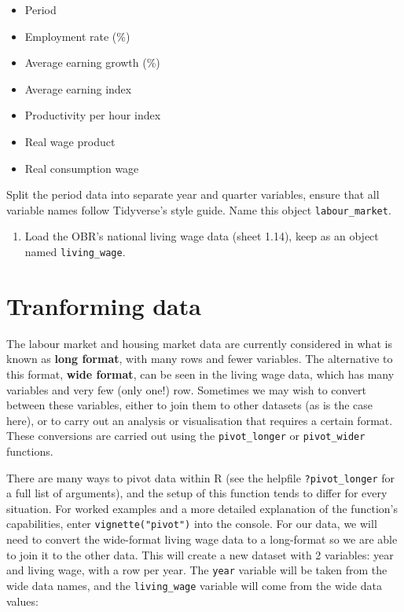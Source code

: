 \documentclass[
  letterpaper,
  DIV=11,
  numbers=noendperiod]{scrreprt}
\providecommand{\tightlist}{%
  \setlength{\itemsep}{0pt}\setlength{\parskip}{0pt}}\usepackage{longtable,booktabs,array}
\begin{document}
\begin{itemize}
\tightlist
\item
  Period
\item
  Employment rate (\%)
\item
  Average earning growth (\%)
\item
  Average earning index
\item
  Productivity per hour index
\item
  Real wage product
\item
  Real consumption wage
\end{itemize}

Split the period data into separate year and quarter variables, ensure
that all variable names follow Tidyverse's style guide. Name this object
\texttt{labour\_market}.

\begin{enumerate}
\def\labelenumi{\arabic{enumi}.}
\setcounter{enumi}{1}
\tightlist
\item
  Load the OBR's national living wage data (sheet 1.14), keep as an
  object named \texttt{living\_wage}.
\end{enumerate}

\section{Tranforming data}\label{tranforming-data}

The labour market and housing market data are currently considered in
what is known as \textbf{long format}, with many rows and fewer
variables. The alternative to this format, \textbf{wide format}, can be
seen in the living wage data, which has many variables and very few
(only one!) row. Sometimes we may wish to convert between these
variables, either to join them to other datasets (as is the case here),
or to carry out an analysis or visualisation that requires a certain
format. These conversions are carried out using the
\texttt{pivot\_longer} or \texttt{pivot\_wider} functions.

There are many ways to pivot data within R (see the helpfile
\texttt{?pivot\_longer} for a full list of arguments), and the setup of
this function tends to differ for every situation. For worked examples
and a more detailed explanation of the function's capabilities, enter
\texttt{vignette("pivot")} into the console. For our data, we will need
to convert the wide-format living wage data to a long-format so we are
able to join it to the other data. This will create a new dataset with 2
variables: year and living wage, with a row per year. The \texttt{year}
variable will be taken from the wide data names, and the
\texttt{living\_wage} variable will come from the wide data values:
\end{document}
